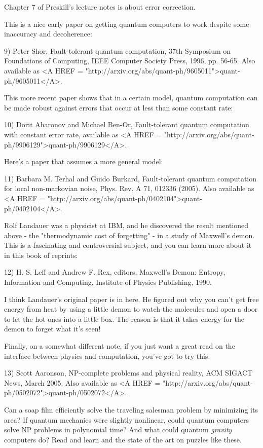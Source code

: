 Chapter 7 of Preskill's lecture notes is about error correction.

This is a nice early paper on getting quantum computers to work
despite some inaccuracy and decoherence:

9) Peter Shor, Fault-tolerant quantum computation, 37th Symposium on
Foundations of Computing, IEEE Computer Society Press, 1996,
pp. 56-65.  Also available as <A HREF =
"http://arxiv.org/abs/quant-ph/9605011">quant-ph/9605011</A>.

This more recent paper shows that in a certain model, quantum 
computation can be made robust against errors that occur at less
than some constant rate:

10) Dorit Aharonov and Michael Ben-Or, Fault-tolerant quantum
computation with constant error rate, available as <A HREF =
"http://arxiv.org/abs/quant-ph/9906129">quant-ph/9906129</A>.

Here's a paper that assumes a more general model:

11) Barbara M. Terhal and Guido Burkard, Fault-tolerant quantum
computation for local non-markovian noise, Phys. Rev. A 71, 012336
(2005).  Also available as <A HREF =
"http://arxiv.org/abs/quant-ph/0402104">quant-ph/0402104</A>.

Rolf Landauer was a physicist at IBM, and he discovered the result
mentioned above - the "thermodynamic cost of forgetting" -
in a study of Maxwell's demon.  This is a fascinating and
controversial subject, and you can learn more about it in this book of
reprints:

12) H. S. Leff and Andrew F. Rex, editors, Maxwell's Demon: Entropy,
Information and Computing, Institute of Physics Publishing, 1990.

I think Landauer's original paper is in here.  He figured out why
you can't get free energy from heat by using a little demon to
watch the molecules and open a door to let the hot ones into a
little box.  The reason is that it takes energy for the demon to
forget what it's seen!  

Finally, on a somewhat different note, if you just want a great
read on the interface between physics and computation, you've got
to try this:

13) Scott Aaronson, NP-complete problems and physical reality, ACM
SIGACT News, March 2005.  Also available as <A HREF =
"http://arxiv.org/abs/quant-ph/0502072">quant-ph/0502072</A>.

Can a soap film efficiently solve the traveling salesman problem
by minimizing its area?  If quantum mechanics were slightly nonlinear,
could quantum computers solve NP problems in polynomial time?  And
what could quantum \emph{gravity} computers do?  Read and learn and the
state of the art on puzzles like these.

